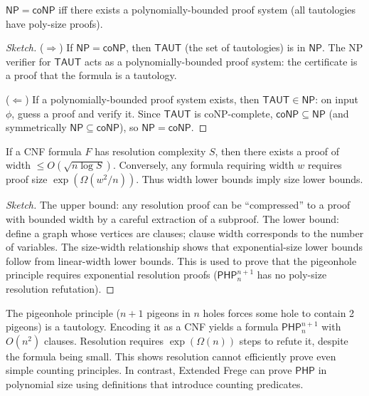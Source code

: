 \begin{theorem}
$\mathsf{NP} = \mathsf{coNP}$ iff there exists a polynomially-bounded proof system (all tautologies have poly-size proofs).
\end{theorem}

\begin{proof}[Sketch]
($\Rightarrow$) If $\mathsf{NP} = \mathsf{coNP}$, then $\mathsf{TAUT}$ (the set of tautologies) is in $\mathsf{NP}$. The NP verifier for $\mathsf{TAUT}$ acts as a polynomially-bounded proof system: the certificate is a proof that the formula is a tautology.

($\Leftarrow$) If a polynomially-bounded proof system exists, then $\mathsf{TAUT} \in \mathsf{NP}$: on input $\phi$, guess a proof and verify it. Since $\mathsf{TAUT}$ is coNP-complete, $\mathsf{coNP} \subseteq \mathsf{NP}$ (and symmetrically $\mathsf{NP} \subseteq \mathsf{coNP}$), so $\mathsf{NP} = \mathsf{coNP}$.
\end{proof}

\begin{theorem}
If a CNF formula $F$ has resolution complexity $S$, then there exists a proof of width $\le O(\sqrt{n \log S})$. Conversely, any formula requiring width $w$ requires proof size $\exp(\Omega(w^2/n))$. Thus width lower bounds imply size lower bounds.
\end{theorem}

\begin{proof}[Sketch]
The upper bound: any resolution proof can be ``compressed'' to a proof with bounded width by a careful extraction of a subproof. The lower bound: define a graph whose vertices are clauses; clause width corresponds to the number of variables. The size-width relationship shows that exponential-size lower bounds follow from linear-width lower bounds. This is used to prove that the pigeonhole principle requires exponential resolution proofs ($\mathsf{PHP}_n^{n+1}$ has no poly-size resolution refutation).
\end{proof}

\begin{example}
The pigeonhole principle ($n+1$ pigeons in $n$ holes forces some hole to contain 2 pigeons) is a tautology. Encoding it as a CNF yields a formula $\mathsf{PHP}_n^{n+1}$ with $O(n^2)$ clauses. Resolution requires $\exp(\Omega(n))$ steps to refute it, despite the formula being small. This shows resolution cannot efficiently prove even simple counting principles. In contrast, Extended Frege can prove $\mathsf{PHP}$ in polynomial size using definitions that introduce counting predicates.
\end{example}

